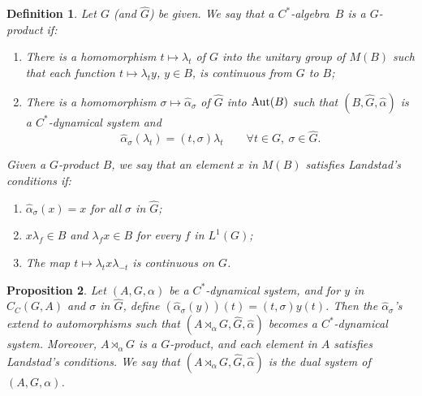 \documentclass{book}
\newtheorem{definition}{Definition}[section]
\newtheorem{proposition}[definition]{Proposition}
\def\cstar{\(C^*\)-algebra}
\begin{document}
\begin{definition}
  Let \(G\) (and \(\hat{G}\)) be given. We say that a \cstar\ \(B\) is a \textnormal{\(G\)-product} if:
  \begin{enumerate}
    \item There is a homomorphism \(t\mapsto \lambda_t\) of \(G\) into the unitary group of \(M(B)\)
      such that each function \(t\mapsto \lambda_t y\), \(y\in B\), is continuous from \(G\) to \(B\);
    \item There is a homomorphism \(\sigma\mapsto\hat{\alpha}_\sigma\) of \(\hat{G}\) into \(\textnormal{Aut}(B)\)
      such that \((B,\hat{G},\hat{\alpha})\) is a \(C^*\)-dynamical system and
      \[
        \hat{\alpha}_\sigma(\lambda_t)=(t,\sigma)\lambda_t\qquad\forall t\in G,\ \sigma\in\hat{G}.
      \]
  \end{enumerate}\par
  Given a \(G\)-product \(B\), we say that an element \(x\) in \(M(B)\) satisfies \textnormal{Landstad's conditions} if:
  \begin{enumerate}
    \item \(\hat{\alpha}_\sigma(x)=x\) for all \(\sigma\) in \(\hat{G}\);
    \item \(x\lambda_f\in B\) and \(\lambda_f x\in B\) for every \(f\) in \(L^1(G)\);
    \item The map \(t\mapsto \lambda_t x\lambda_{-t}\) is continuous on \(G\).
  \end{enumerate}
\end{definition}
\begin{proposition}\label{Petersen:783}
  Let \((A,G,\alpha)\) be a \(C^*\)-dynamical system, and for \(y\) in \(C_C(G,A)\)
  and \(\sigma\) in \(\hat{G}\), define \((\hat{\alpha}_\sigma(y))(t)=(t,\sigma)y(t)\).
  Then the \(\hat{\alpha}_\sigma\)'s extend to automorphisms such that
  \((A\rtimes_\alpha G,\hat{G},\hat{\alpha})\) becomes a \(C^*\)-dynamical system. Moreover,
  \(A\rtimes_\alpha G\) is a \(G\)-product, and each element in \(A\) satisfies Landstad's conditions.
  We say that \((A\rtimes_\alpha G,\hat{G},\hat{\alpha})\) is the \textnormal{dual system} of \((A,G,\alpha)\).
\end{proposition}
\end{document}
